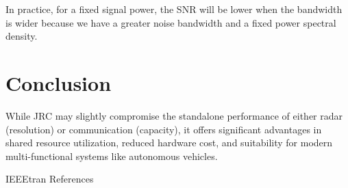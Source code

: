 \documentclass[conference]{IEEEtran}
\begin{document}
In practice, for a fixed signal power, the SNR will be lower when the bandwidth is wider because we have a greater noise bandwidth and a fixed power spectral density.

\section {Conclusion}
While JRC may slightly compromise the standalone performance of either radar (resolution) or communication (capacity), it offers significant advantages in shared resource utilization, reduced hardware cost, and suitability for modern multi-functional systems like autonomous vehicles.


	 {IEEEtran}
	 {References}
	
  
\end{document}

